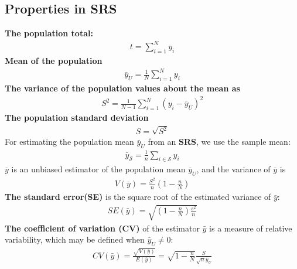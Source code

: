 \documentclass[a4paper,twoside,11pt]{article}
\begin{document}
\subsection{Properties in SRS}
\textbf{The population total:}
\begin{equation*}
\begin{aligned}
t = \sum^N_{i=1} y_i
\end{aligned}
\end{equation*}
\textbf{Mean of the population}
\begin{equation*}
\begin{aligned}
\bar{y}_U = \frac{1}{N}\sum^N_{i=1} y_i
\end{aligned}
\end{equation*}
\textbf{The variance of the population values about the mean as}
\begin{equation*}
\begin{aligned}
S^2 = \frac{1}{N-1} \sum^N_{i=1} (y_i - \bar{y}_U)^2
\end{aligned}
\end{equation*}
\textbf{The population standard deviation}
\begin{equation*}
\begin{aligned}
S = \sqrt{S^2}
\end{aligned}
\end{equation*}
For estimating the population mean $\bar{y}_U$ from an \textbf{SRS}, we use the sample mean:
\begin{equation*}
\begin{aligned}
\bar{y}_{\mathcal{S}} = \frac{1}{n} \sum_{i \in \mathcal{S}}y_i
\end{aligned}
\end{equation*}
$\bar{y}$ is an unbiased estimator of the population mean $\bar{y}_U$, and the variance of $\bar{y}$ is 
\begin{equation*}
\begin{aligned}
V(\bar{y}) = \frac{S^2}{n}(1-\frac{n}{N})
\end{aligned}
\end{equation*}
\textbf{The standard error(SE)} is the square root of the estimated variance of $\bar{y}:$ 
\begin{equation*}
\begin{aligned}
SE(\bar{y}) = \sqrt{(1-\frac{n}{N})\frac{s^2}{n}}
\end{aligned}
\end{equation*}
\textbf{The coefficient of variation (CV)} of the estimator $\bar{y}$ is a measure of relative variability, which may be defined when $\bar{y}_U \ne 0:$
\begin{equation*}
\begin{aligned}
CV(\bar{y}) = \frac{\sqrt{V(\bar{y})}}{E(\bar{y})} = \sqrt{1-\frac{n}{N}}\frac{S}{\sqrt{n}\bar{y}_U}
\end{aligned}
\end{equation*}
\end{document}
